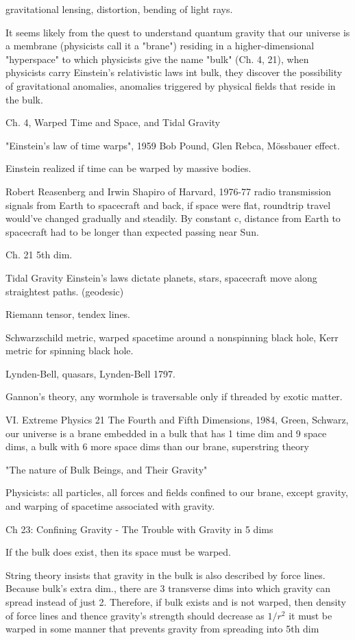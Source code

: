 \documentclass[10pt]{amsart}
\begin{document}
gravitational lensing, distortion, bending of light rays.

It seems likely from the quest to understand quantum gravity that our universe is a membrane (physicists call it a "brane") residing in a higher-dimensional "hyperspace" to which physicists give the name "bulk" (Ch. 4, 21), when physicists carry Einstein's relativistic laws int bulk, they discover the possibility of gravitational anomalies, anomalies triggered by physical fields that reside in the bulk.

Ch. 4, Warped Time and Space, and Tidal Gravity

"Einstein's law of time warps", 1959 Bob Pound, Glen Rebca, M\"{o}ssbauer effect.

Einstein realized if time can be warped by massive bodies.

Robert Reasenberg and Irwin Shapiro of Harvard, 1976-77 radio transmission signals from Earth to spacecraft and back, if space were flat, roundtrip travel would've changed gradually and steadily. By constant c, distance from Earth to spacecraft had to be longer than expected passing near Sun.

Ch. 21 5th dim.

Tidal Gravity
Einstein's laws dictate planets, stars, spacecraft move along straightest paths. (geodesic)

Riemann tensor, tendex lines.

Schwarzschild metric, warped spacetime around a nonspinning black hole, Kerr metric for spinning black hole.

Lynden-Bell, quasars, Lynden-Bell 1797.

Gannon's theory, any wormhole is traversable only if threaded by exotic matter.

VI. Extreme Physics 21 The Fourth and Fifth Dimensions, 1984, Green, Schwarz, our universe is a brane embedded in a bulk that has 1 time dim and 9 space dims, a bulk with 6 more space dims than our brane, superstring theory

"The nature of Bulk Beings, and Their Gravity"

Physicists: all particles, all forces and fields confined to our brane, except gravity, and warping of spacetime associated with gravity.

Ch 23: Confining Gravity - The Trouble with Gravity in 5 dims

If the bulk does exist, then its space must be warped.

String theory insists that gravity in the bulk is also described by force lines.
Because bulk's extra dim., there are 3 transverse dims into which gravity can spread instead of just 2.
Therefore, if bulk exists and is not warped, then density of force lines and thence gravity's strength should decrease as $1/r^2$
it must be warped in some manner that prevents gravity from spreading into 5th dim
\end{document}
